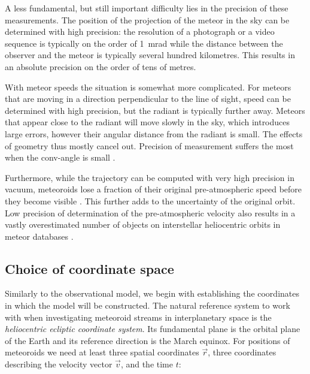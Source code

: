     A less fundamental, but still important difficulty lies in the precision of these measurements.
    The position of the projection of the meteor in the sky can be determined with high precision:
    the resolution of a photograph or a video sequence is typically on the order of \SI{1}{\milli\radian}
    while the distance between the observer and the meteor is typically several hundred kilometres.
    This results in an absolute precision on the order of tens of metres.

    With meteor speeds the situation is somewhat more complicated.
    For meteors that are moving in a direction perpendicular to the line of sight, speed can be determined
    with high precision, but the radiant is typically further away.
    Meteors that appear close to the radiant will move slowly in the sky, which introduces large errors,
    however their angular distance from the radiant is small. The effects of geometry thus mostly cancel out.
    Precision of measurement suffers the most when the \gls{conv-angle} is small \citep{ceplecha1987}.

    Furthermore, while the trajectory can be computed with very high precision in vacuum,
    meteoroids lose a fraction of their original pre-atmospheric speed before they become visible \citep{vida+2018}.
    This further adds to the uncertainty of the original orbit.
    Low precision of determination of the pre-atmospheric velocity also results in a vastly overestimated
    number of objects on interstellar heliocentric orbits in meteor databases \citep{hajdukovajr1994}.

    \subsection{Choice of coordinate space} \label{moc}
        Similarly to the observational model, we begin with establishing the coordinates in which the model will be constructed.
        The natural reference system to work with when investigating meteoroid streams in interplanetary space
        is the \emph{heliocentric ecliptic coordinate system}. Its fundamental plane is the orbital plane of the Earth
        and its reference direction is the March equinox.
        For positions of meteoroids we need at least three spatial coordinates $\vec{r}$,
        three coordinates describing the velocity vector $\vec{v}$, and the time $t$:

